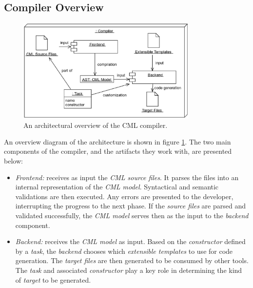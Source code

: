 \subsection{Compiler Overview}\label{subsec:overview}

\begin{figure}
\centering
\includegraphics[width=0.8\textwidth]{compiler/figure-overview}
\caption{An architectural overview of the CML compiler.}
\label{fig:overview}
\end{figure}

An overview diagram of the architecture is shown in figure \ref{fig:overview}.
The two main components of the compiler,
and the artifacts they work with,
are presented below:

\begin{itemize}

\item \emph{Frontend:} receives as input the \emph{CML source files}.
It parses the files into an internal representation of the \emph{CML model}.
Syntactical and semantic validations are then executed.
Any errors are presented to the developer, interrupting the progress to the next phase.
If the \emph{source files} are parsed and validated successfully,
the \emph{CML model} serves then as the input to the \emph{backend} component.

\item \emph{Backend:} receives the \emph{CML model} as input.
Based on the \emph{constructor} defined by a \emph{task},
the \emph{backend} chooses which \emph{extensible templates} to use for code generation.
The \emph{target files} are then generated to be consumed by other tools.
The \emph{task} and associated \emph{constructor} play a key role
in determining the kind of \emph{target} to be generated.

\end{itemize}
